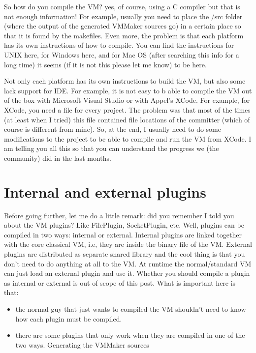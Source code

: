 \documentclass[a4paper,10pt,twoside]{book}
\begin{document}
So how do you compile the VM?  yes, of course, using a C compiler but that is not enough information! For example, usually you need to place the /src folder (where the output of the generated VMMaker sources go) in a certain place so that it is found by the makefiles. Even more, the problem is that each platform has its own instructions of how to compile. You can find the instructions for UNIX here, for Windows here, and for Mac OS (after searching this info for a long time) it seems (if it is not this please let me know) to be here.

Not only each platform has its own instructions to build the VM, but also some lack support for IDE. For example, it is not easy to b able to compile the VM out of the box with Microsoft Visual Studio or with Appel's XCode. For example, for XCode, you need a  file for every project. The problem was that most of the times (at least when I tried) this file contained file locations of the committer (which of course is different from mine). So, at the end, I usually need to do some modifications to the project to be able to compile and run the VM from XCode. I am telling you all this so that you can understand the progress we (the community) did in the last months. 


\section{Internal and external plugins}
Before going further, let me do a little remark: did you remember I told you about the VM plugins?  Like FilePlugin, SocketPlugin, etc. Well, plugins can be compiled in two ways: internal or external. Internal plugins are linked together with the core classical VM, i.e, they are inside the binary file of the VM. External plugins are distributed as separate shared library and the cool thing is that you don't need to do anything at all to the VM. At runtime the normal/standard VM can just load an external plugin and use it. Whether you should compile a plugin as internal or external is out of scope of this post. What is important here is that:

\begin{itemize}
\item the normal guy that just wants to compiled the VM shouldn't need to know how each plugin must be compiled.
\item there are some plugins that only work when they are compiled in one of the two ways.
Generating the VMMaker sources
\end{itemize}
\end{document}
